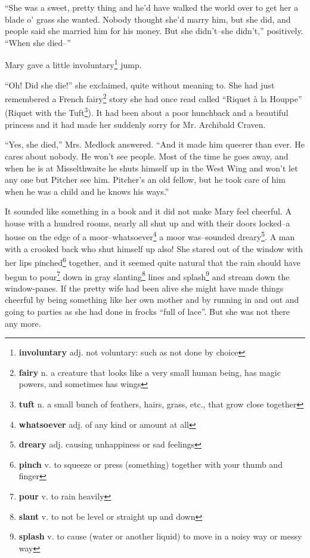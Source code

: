 ``She was a sweet, pretty thing and he'd have walked the world over to get her a blade o' grass she wanted. Nobody thought she'd marry him, but she did, and people said she married him for his money. But she didn't--she didn't,'' positively. ``When she died--''

Mary gave a little involuntary\footnote{\textbf{involuntary} adj. not voluntary: such as not done by choice} jump.

``Oh! Did she die!'' she exclaimed, quite without meaning to. She had just remembered a French fairy\footnote{\textbf{fairy} n. a creature that looks like a very small human being, has magic powers, and sometimes has wings} story she had once read called ``Riquet \`{a} la Houppe'' (Riquet with the Tuft\footnote{\textbf{tuft} n. a small bunch of feathers, hairs, grass, etc., that grow close together}). It had been about a poor hunchback and a beautiful princess and it had made her suddenly sorry for Mr. Archibald Craven.

``Yes, she died,'' Mrs. Medlock answered. ``And it made him queerer than ever. He cares about nobody. He won't see people. Most of the time he goes away, and when he is at Misselthwaite he shuts himself up in the West Wing and won't let any one but Pitcher see him. Pitcher's an old fellow, but he took care of him when he was a child and he knows his ways.''

It sounded like something in a book and it did not make Mary feel cheerful. A house with a hundred rooms, nearly all shut up and with their doors locked--a house on the edge of a moor--whatsoever\footnote{\textbf{whatsoever} adj. of any kind or amount at all} a moor was--sounded dreary\footnote{\textbf{dreary} adj. causing unhappiness or sad feelings}. A man with a crooked back who shut himself up also! She stared out of the window with her lips pinched\footnote{\textbf{pinch} v. to squeeze or press (something) together with your thumb and finger} together, and it seemed quite natural that the rain should have begun to pour\footnote{\textbf{pour} v. to rain heavily} down in gray slanting\footnote{\textbf{slant} v. to not be level or straight up and down} lines and splash\footnote{\textbf{splash} v. to cause (water or another liquid) to move in a noisy way or messy way} and stream down the window-panes. If the pretty wife had been alive she might have made things cheerful by being something like her own mother and by running in and out and going to parties as she had done in frocks ``full of lace''. But she was not there any more.

